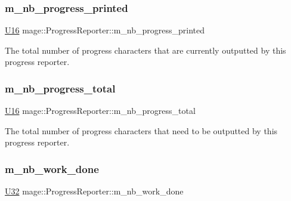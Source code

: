 \subsubsection{\texorpdfstring{m\+\_\+nb\+\_\+progress\+\_\+printed}{m\_nb\_progress\_printed}}
{\footnotesize\ttfamily \hyperlink{namespacemage_af69057eec1ce005c1c3b34ae33486f16}{U16} mage\+::\+Progress\+Reporter\+::m\+\_\+nb\+\_\+progress\+\_\+printed\hspace{0.3cm}{\ttfamily [private]}}

The total number of progress characters that are currently outputted by this progress reporter. \hypertarget{classmage_1_1_progress_reporter_a09f5810467f9bb1fa4465e6d957748f3}{}\label{classmage_1_1_progress_reporter_a09f5810467f9bb1fa4465e6d957748f3} 
\subsubsection{\texorpdfstring{m\+\_\+nb\+\_\+progress\+\_\+total}{m\_nb\_progress\_total}}
{\footnotesize\ttfamily \hyperlink{namespacemage_af69057eec1ce005c1c3b34ae33486f16}{U16} mage\+::\+Progress\+Reporter\+::m\+\_\+nb\+\_\+progress\+\_\+total\hspace{0.3cm}{\ttfamily [private]}}

The total number of progress characters that need to be outputted by this progress reporter. \hypertarget{classmage_1_1_progress_reporter_a94bdbb09ae95976c72f1a8387ff96b70}{}\label{classmage_1_1_progress_reporter_a94bdbb09ae95976c72f1a8387ff96b70} 
\subsubsection{\texorpdfstring{m\+\_\+nb\+\_\+work\+\_\+done}{m\_nb\_work\_done}}
{\footnotesize\ttfamily \hyperlink{namespacemage_a41c104c036fba3756a74e19f793eeaa1}{U32} mage\+::\+Progress\+Reporter\+::m\+\_\+nb\+\_\+work\+\_\+done\hspace{0.3cm}{\ttfamily [private]}}

